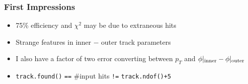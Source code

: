 \documentclass[12pt,compress]{beamer}
\begin{document}
\begin{frame}
\frametitle{First Impressions}
\label{numpages}

\begin{itemize}\setlength{\itemsep}{0.5 cm}
\item 75\% efficiency and $\chi^2$ may be due to extraneous hits
\item Strange features in inner $-$ outer track parameters
\item I also have a factor of two error converting between $p_T$ and $\phi|_{\mbox{\scriptsize inner}} - \phi|_{\mbox{\scriptsize outer}}$
\item {\small \tt track.found()} {\small \tt ==} \#input hits {\small \tt !=} {\small \tt track.ndof()+5}
\end{itemize}

\end{frame}
\end{document}
